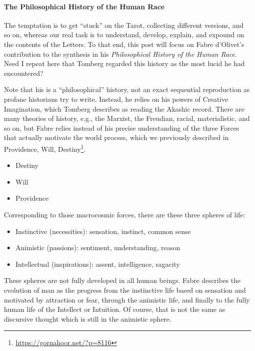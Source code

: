 \paragraph{The Philosophical History of the Human Race}


The temptation is to get ``stuck'' on the Tarot, collecting different versions, and so on, whereas our real task is to understand, develop, explain, and expound on the contents of the Letters. To that end, this post will focus on Fabre d'Olivet's contribution to the synthesis in his \emph{Philosophical History of the Human Race}. Need I repeat here that Tomberg regarded this history as the most lucid he had encountered?

Note that his is a ``philosophical'' history, not an exact sequential reproduction as profane historians try to write. Instead, he relies on his powers of Creative Imagination, which Tomberg describes as reading the Akashic record. There are many theories of history, e.g., the Marxist, the Freudian, racial, materialistic, and so on, but Fabre relies instead of his precise understanding of the three Forces that actually motivate the world process, which we previously described in Providence, Will, Destiny\footnote{\url{https://gornahoor.net/?p=8116}}.

\begin{itemize}


\item Destiny

\item Will

\item Providence
\end{itemize}


Corresponding to those macrocosmic forces, there are these three spheres of life:

\begin{itemize}


\item Instinctive (necessities): sensation, instinct, common sense

\item Animistic (passions): sentiment, understanding, reason

\item Intellectual (inspirations): assent, intelligence, sagacity
\end{itemize}


These spheres are not fully developed in all human beings. Fabre describes the evolution of man as the progress from the instinctive life based on sensation and motivated by attraction or fear, through the animistic life, and finally to the fully human life of the Intellect or Intuition. Of course, that is not the same as discursive thought which is still in the animistic sphere.

